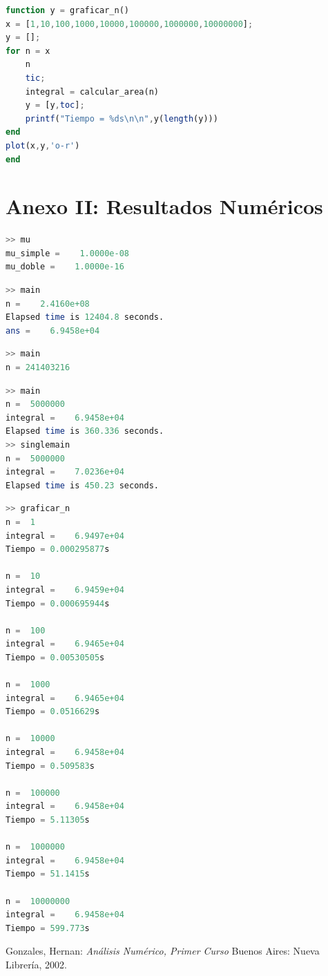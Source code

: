 \documentclass[11pt,a4paper]{article}
\begin{document}
\begin{lstlisting}[language=Octave,title=Truncamiento y gráfico de n]
function y = graficar_n()
x = [1,10,100,1000,10000,100000,1000000,10000000];
y = [];
for n = x
    n
    tic;
    integral = calcular_area(n)
    y = [y,toc]; 
    printf("Tiempo = %ds\n\n",y(length(y)))   
end
plot(x,y,'o-r')
end
\end{lstlisting}

\newpage
\section{Anexo II: Resultados Numéricos}

\begin{lstlisting}[language=Octave,title=Resultados de \texttt{mu.m}]
>> mu
mu_simple =    1.0000e-08
mu_doble =    1.0000e-16
\end{lstlisting}

\begin{lstlisting}[language=Octave,title=Resultados originales sin truncamiento de n]
>> main
n =    2.4160e+08
Elapsed time is 12404.8 seconds.
ans =    6.9458e+04
\end{lstlisting}

\begin{lstlisting}[language=Octave,title=n con precisión simple]
>> main
n = 241403216
\end{lstlisting}

\begin{lstlisting}[language=Octave,title=Resultados con truncamiento de n]
>> main
n =  5000000
integral =    6.9458e+04
Elapsed time is 360.336 seconds.
>> singlemain
n =  5000000
integral =    7.0236e+04
Elapsed time is 450.23 seconds.
\end{lstlisting}

\begin{lstlisting}[language=Octave,title=Cálculos hechos para el criterio de truncamiento de n]
>> graficar_n
n =  1
integral =    6.9497e+04
Tiempo = 0.000295877s

n =  10
integral =    6.9459e+04
Tiempo = 0.000695944s

n =  100
integral =    6.9465e+04
Tiempo = 0.00530505s

n =  1000
integral =    6.9465e+04
Tiempo = 0.0516629s

n =  10000
integral =    6.9458e+04
Tiempo = 0.509583s

n =  100000
integral =    6.9458e+04
Tiempo = 5.11305s

n =  1000000
integral =    6.9458e+04
Tiempo = 51.1415s

n =  10000000
integral =    6.9458e+04
Tiempo = 599.773s
\end{lstlisting}

\newpage

{}
\renewcommand\refname{Bibliografía}
\begin{thebibliography}{9}

Gonzales, Hernan: 
\textit{Análisis Numérico, Primer Curso}
Buenos Aires: Nueva Librería, 2002.

\end{thebibliography}
\end{document}
